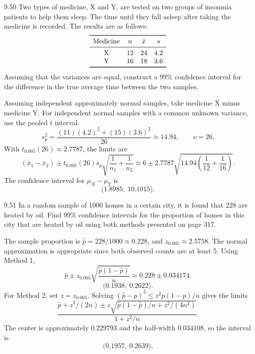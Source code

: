 \documentclass[11pt,oneside]{article}
\begin{document}
\begin{exercise}{9.50}
Two types of medicine, X and Y, are tested on two groups of insomnia patients to help them sleep. The time until they fall asleep after taking the medicine is recorded. The results are as follows:
\[
\begin{array}{cccc}\toprule
\text{Medicine} & n & \bar x & s\\\midrule
\text{X} & 12 & 24 & 4.2\\
\text{Y} & 16 & 18 & 3.6\\
\bottomrule\end{array}
\]
Assuming that the variances are equal, construct a 99\% confidence interval for the difference in the true average time between the two samples.
\end{exercise}
\begin{solution}
Assuming independent approximately normal samples, take medicine X minus medicine Y. For independent normal samples with a common unknown variance, use the pooled $t$ interval.
\[
s_p^2=\frac{(11)(4.2)^2+(15)(3.6)^2}{26}\approx14.94,\qquad \nu=26.
\]
 With $t_{0.005}(26)\approx2.7787$, the limits are
\[
(\bar x_1-\bar x_2)\pm t_{0.005}(26)s_p\sqrt{\frac1{n_1}+\frac1{n_2}}\approx 6\pm 2.7787\sqrt{14.94\left(\frac1{12}+\frac1{16}\right)}.
\]
The confidence interval for $\mu_X-\mu_Y$ is 
\[
\boxed{\bigl(1.8985,\ 10.1015\bigr)}.
\]
\end{solution}

\begin{exercise}{9.51}
In a random sample of 1000 homes in a certain city, it is found that 228 are heated by oil. Find 99\% confidence intervals for the proportion of homes in this city that are heated by oil using both methods presented on page 317.
\end{exercise}
\begin{solution}
The sample proportion is $\hat p=228/1000\approx0.228$, and $z_{0.005}\approx2.5758$. The normal approximation is appropriate since both observed counts are at least 5. Using Method 1,
\[
\hat p\pm z_{0.005}\sqrt{\frac{\hat p(1-\hat p)}{n}}\approx0.228\pm 0.034174.
\]
\[
\boxed{\bigl(0.1938,\ 0.2622\bigr)}.
\]
For Method 2, set $z=z_{0.005}$. Solving $(\hat p-p)^2\le z^2p(1-p)/n$ gives the limits
\[
\frac{\hat p+z^2/(2n)\pm z\sqrt{\hat p(1-\hat p)/n+z^2/(4n^2)}}{1+z^2/n}.
\]
The center is approximately $0.229793$ and the half-width $0.034108$, so the interval is
\[
\boxed{\bigl(0.1957,\ 0.2639\bigr)}.
\]
\end{solution}
\end{document}
